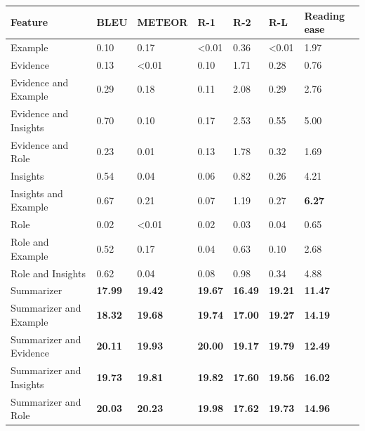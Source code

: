 \begin{tabular}{|l|l|l|l|l|l|l|}
\hline
\textbf{Feature} & BLEU & METEOR & R-1 & R-2 & R-L & Reading ease \\
 \hline
 Example & 0.10 & 0.17 & \textless{}0.01 & 0.36 & \textless{}0.01 & 1.97 \\
 \hline
 Evidence & 0.13 & \textless{}0.01 & 0.10 & 1.71 & 0.28 & 0.76 \\
 \hline
 Evidence and Example & 0.29 & 0.18 & 0.11 & 2.08 & 0.29 & 2.76 \\
 \hline
 Evidence and Insights & 0.70 & 0.10 & 0.17 & 2.53 & 0.55 & 5.00 \\
 \hline
 Evidence and Role & 0.23 & 0.01 & 0.13 & 1.78 & 0.32 & 1.69 \\
 \hline
 Insights & 0.54 & 0.04 & 0.06 & 0.82 & 0.26 & 4.21 \\
 \hline
 Insights and Example & 0.67 & 0.21 & 0.07 & 1.19 & 0.27 & \textbf{6.27} \\
 \hline
 Role & 0.02 & \textless{}0.01 & 0.02 & 0.03 & 0.04 & 0.65 \\
 \hline
 Role and Example & 0.52 & 0.17 & 0.04 & 0.63 & 0.10 & 2.68 \\
 \hline
 Role and Insights & 0.62 & 0.04 & 0.08 & 0.98 & 0.34 & 4.88 \\
 \hline
 Summarizer & \textbf{17.99} & \textbf{19.42} & \textbf{19.67} & \textbf{16.49} & \textbf{19.21} & \textbf{11.47} \\
 \hline
 Summarizer and Example & \textbf{18.32} & \textbf{19.68} & \textbf{19.74} & \textbf{17.00} & \textbf{19.27} & \textbf{14.19} \\
 \hline
 Summarizer and Evidence & \textbf{20.11} & \textbf{19.93} & \textbf{20.00} & \textbf{19.17} & \textbf{19.79} & \textbf{12.49} \\
 \hline
 Summarizer and Insights & \textbf{19.73} & \textbf{19.81} & \textbf{19.82} & \textbf{17.60} & \textbf{19.56} & \textbf{16.02} \\
 \hline
 Summarizer and Role & \textbf{20.03} & \textbf{20.23} & \textbf{19.98} & \textbf{17.62} & \textbf{19.73} & \textbf{14.96} \\
\hline
\end{tabular}
